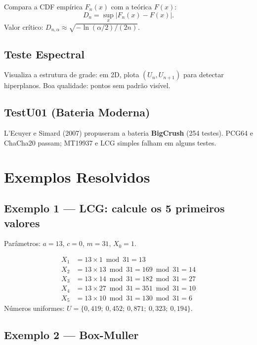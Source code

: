 \documentclass[12pt,a4paper]{article}
\begin{document}
Compara a CDF emp\'irica $F_n(x)$ com a te\'orica $F(x)$:
\[
  D_n = \sup_x |F_n(x) - F(x)|.
\]
Valor cr\'itico: $D_{n, \alpha} \approx \sqrt{-\ln(\alpha/2)/(2n)}$.

\subsection{Teste Espectral}

Visualiza a estrutura de grade: em 2D, plota $(U_n, U_{n+1})$ para detectar hiperplanos. Boa qualidade: pontos sem padr\~ao vis\'ivel.

\subsection{TestU01 (Bateria Moderna)}

L'Ecuyer e Simard (2007) propuseram a bateria \textbf{BigCrush} (254 testes). PCG64 e ChaCha20 passam; MT19937 e LCG simples falham em alguns testes.

\section{Exemplos Resolvidos}

\subsection*{Exemplo 1 --- LCG: calcule os 5 primeiros valores}

Par\^ametros: $a = 13$, $c = 0$, $m = 31$, $X_0 = 1$.

\begin{align*}
X_1 &= 13 \times 1 \bmod 31 = 13 \\ 
X_2 &= 13 \times 13 \bmod 31 = 169 \bmod 31 = 14 \\
X_3 &= 13 \times 14 \bmod 31 = 182 \bmod 31 = 27 \\
X_4 &= 13 \times 27 \bmod 31 = 351 \bmod 31 = 10 \\
X_5 &= 13 \times 10 \bmod 31 = 130 \bmod 31 = 6
\end{align*}
N\'umeros uniformes: $U = \{0{,}419;\ 0{,}452;\ 0{,}871;\ 0{,}323;\ 0{,}194\}$.

\subsection*{Exemplo 2 --- Box-Muller}
\end{document}
